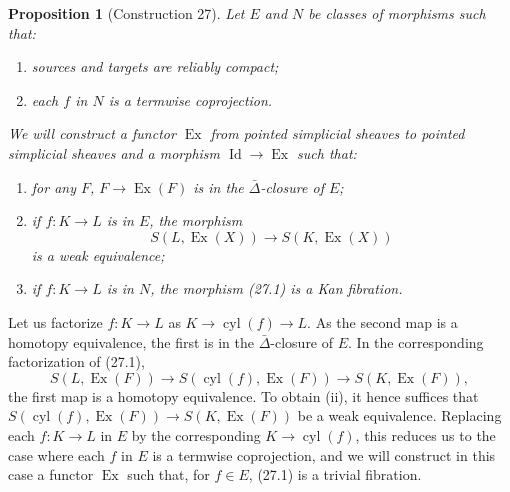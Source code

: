 \documentclass[11pt]{article}
\theoremstyle{deligne}
\newtheorem*{proposition*}{Proposition}
\newcommand{\Ex}{\operatorname{Ex}}
\newcommand{\Id}{\operatorname{Id}}
\newcommand{\cyl}{\operatorname{cyl}}
\begin{document}
\begin{proposition*}[Construction 27]
Let \(E\) and \(N\) be classes of morphisms such that:
\begin{enumerate}[label=(\alph*)]
\item sources and targets are reliably compact;
\item each \(f\) in \(N\) is a termwise coprojection.
\end{enumerate}
We will construct a functor \(\Ex\) from pointed simplicial sheaves to pointed simplicial sheaves and a morphism \(\Id\to\Ex\) such that:
\begin{enumerate}[label=(\roman*)]
\item for any \(F\), \(F\to\Ex(F)\) is in the \(\bar\Delta\)-closure of \(E\);
\item if \(f:K\to L\) is in \(E\), the morphism
\[
S(L,\Ex(X))\longrightarrow S(K,\Ex(X))
\tag{27.1}
\]
is a weak equivalence;
\item if \(f:K\to L\) is in \(N\), the morphism (27.1) is a Kan fibration.
\end{enumerate}
\end{proposition*}

Let us factorize \(f:K\to L\) as \(K\to \cyl(f)\to L\). As the second map is a homotopy equivalence, the first is in the \(\bar\Delta\)-closure of \(E\). In the corresponding factorization of (27.1),
\[
S(L,\Ex(F))\to S(\cyl(f),\Ex(F))\to S(K,\Ex(F)),
\]
the first map is a homotopy equivalence. To obtain (ii), it hence suffices that \(S(\cyl(f),\Ex(F))\to S(K,\Ex(F))\) be a weak equivalence. Replacing each \(f:K\to L\) in \(E\) by the corresponding \(K\to\cyl(f)\), this reduces us to the case where each \(f\) in \(E\) is a termwise coprojection, and we will construct in this case a functor \(\Ex\) such that, for \(f\in E\), (27.1) is a trivial fibration.
\end{document}

